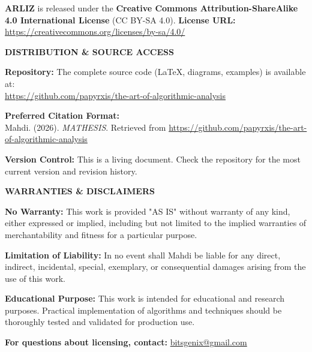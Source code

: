 \begin{flushleft}
	{\small
		\textbf{ARLIZ} is released under the \textbf{Creative Commons Attribution-ShareAlike 4.0 International License} (CC BY-SA 4.0).
		\textbf{License URL:} \url{https://creativecommons.org/licenses/by-sa/4.0/}
		
		\vspace{1em}
		
		\begin{center}
			\textbf{DISTRIBUTION \& SOURCE ACCESS}
		\end{center}
		
		\textbf{Repository:} The complete source code (LaTeX, diagrams, examples) is available at:\\
		\url{https://github.com/papyrxis/the-art-of-algorithmic-analysis}
		
		\textbf{Preferred Citation Format:}\\
		Mahdi. (2026). \textit{MATHESIS}. Retrieved from \url{https://github.com/papyrxis/the-art-of-algorithmic-analysis}
		
		\textbf{Version Control:} This is a living document. Check the repository for the most current version and revision history.
		
		\vspace{1.5em}
		
		\begin{center}
			\textbf{WARRANTIES \& DISCLAIMERS}
		\end{center}
		
		\textbf{No Warranty:} This work is provided "AS IS" without warranty of any kind, either expressed or implied, including but not limited to the implied warranties of merchantability and fitness for a particular purpose.
		
		\textbf{Limitation of Liability:} In no event shall Mahdi be liable for any direct, indirect, incidental, special, exemplary, or consequential damages arising from the use of this work.
		
		\textbf{Educational Purpose:} This work is intended for educational and research purposes. Practical implementation of algorithms and techniques should be thoroughly tested and validated for production use.
	}
\end{flushleft}

\vfill

\begin{center}
	{\footnotesize

		\textbf{For questions about licensing, contact:} \url{bitsgenix@gmail.com}
	}
\end{center}

\clearpage